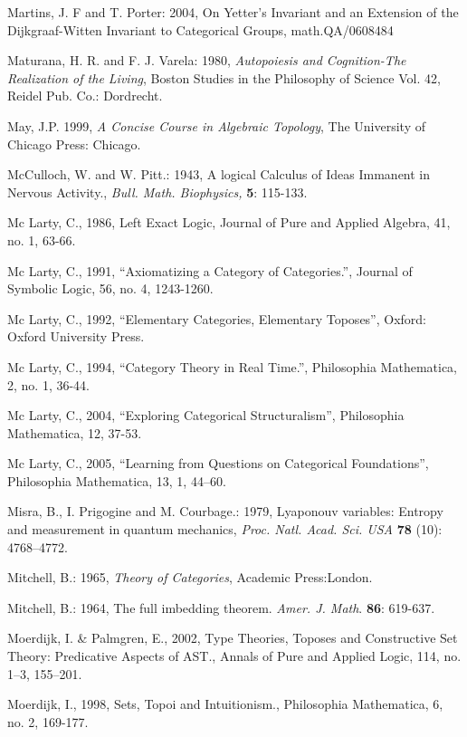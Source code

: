 \documentclass[12pt]{article}
\begin{document}
\begin{thebibliography}{399}
Martins, J. F and T. Porter: 2004, On Yetter's Invariant and an Extension of the Dijkgraaf-Witten Invariant to Categorical Groups, math.QA/0608484

Maturana, H. R. and F. J. Varela: 1980, \emph{Autopoiesis and Cognition-The Realization of the Living}, Boston Studies in the Philosophy of Science Vol. 42, Reidel Pub. Co.: Dordrecht.

May, J.P. 1999, \emph{A Concise Course in Algebraic Topology}, The University of Chicago Press: Chicago.

McCulloch, W. and W. Pitt.: 1943, A logical Calculus of Ideas Immanent in Nervous Activity., \emph{Bull. Math. Biophysics,} \textbf{5}: 115-133.

Mc Larty, C., 1986, Left Exact Logic, Journal of Pure and Applied Algebra, 41, no. 1, 63-66.

Mc Larty, C., 1991, ``Axiomatizing a Category of Categories.'', Journal of Symbolic Logic, 56, no. 4, 1243-1260. 

Mc Larty, C., 1992, ``Elementary Categories, Elementary Toposes'', Oxford: Oxford University Press.

Mc Larty, C., 1994, ``Category Theory in Real Time.'', Philosophia Mathematica, 2, no. 1, 36-44.

Mc Larty, C., 2004, ``Exploring Categorical Structuralism'', Philosophia Mathematica, 12, 37-53.

Mc Larty, C., 2005, ``Learning from Questions on Categorical Foundations'', Philosophia Mathematica, 13, 1, 44--60.

Misra, B.,  I. Prigogine and M. Courbage.: 1979, Lyaponouv variables: Entropy and measurement in quantum mechanics,
\emph{Proc. Natl. Acad. Sci. USA} \textbf{78} (10): 4768--4772.

Mitchell, B.: 1965, \emph{Theory of Categories}, Academic Press:London.

Mitchell, B.: 1964, The full imbedding theorem. \emph{Amer. J. Math}. \textbf{86}: 619-637.

Moerdijk, I. \& Palmgren, E., 2002, Type Theories, Toposes and Constructive Set Theory: Predicative Aspects of AST., Annals of Pure and Applied Logic, 114, no. 1--3, 155--201. 

Moerdijk, I., 1998, Sets, Topoi and Intuitionism., Philosophia Mathematica, 6, no. 2, 169-177.


\end{thebibliography}
\end{document}

